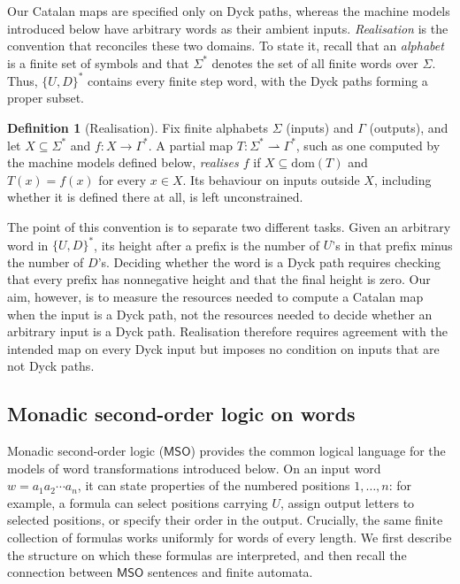\documentclass[11pt]{article}
\theoremstyle{definition}
\newtheorem{definition}[theorem]{Definition}
\newcommand{\MSO}{\mathsf{MSO}}
\begin{document}
Our Catalan maps are specified only on Dyck paths, whereas the machine models
introduced below have arbitrary words as their ambient inputs.  \emph{Realisation}
is the convention that reconciles these two domains.  To state it, recall that
an \emph{alphabet} is a finite set of symbols and that $\Sigma^*$ denotes the set
of all finite words over $\Sigma$.  Thus, $\{U,D\}^*$ contains every finite step
word, with the Dyck paths forming a proper subset.

\begin{definition}[Realisation]\label{def:relative}
Fix finite alphabets $\Sigma$ (inputs) and $\Gamma$ (outputs), and let
$X\subseteq\Sigma^*$ and $f\colon X\to\Gamma^*$.  A partial map
$T\colon\Sigma^*\rightharpoonup\Gamma^*$, such as one computed by the machine
models defined below, \emph{realises $f$} if
$X\subseteq\mathrm{dom}(T)$ and $T(x)=f(x)$ for every $x\in X$.  Its behaviour
on inputs outside $X$, including whether it is defined there at all, is left
unconstrained.
\end{definition}

The point of this convention is to separate two different tasks.  Given an
arbitrary word in $\{U,D\}^*$, its height after a prefix is the number of $U$'s
in that prefix minus the number of $D$'s.  Deciding whether the word is a Dyck
path requires checking that every prefix has nonnegative height and that the
final height is zero.  Our aim, however, is to measure the resources
needed to compute a Catalan map when the input is a Dyck path, not the resources
needed to decide whether an arbitrary input is a Dyck path.  Realisation
therefore requires agreement with the intended map on every Dyck input but
imposes no condition on inputs that are not Dyck paths.

\subsection{Monadic second-order logic on words}\label{sec:mso}

Monadic second-order logic ($\MSO$) provides the common logical language for
the models of word transformations introduced below.  On an input word
$w=a_1a_2\cdots a_n$, it can state properties of the numbered positions
$1,\ldots,n$: for example, a formula can select positions carrying $U$, assign
output letters to selected positions, or specify their order in the output.
Crucially, the same finite collection of formulas works uniformly for words of
every length.  We first describe the structure on which these formulas are
interpreted, and then recall the connection between $\MSO$ sentences and
finite automata.
\end{document}
